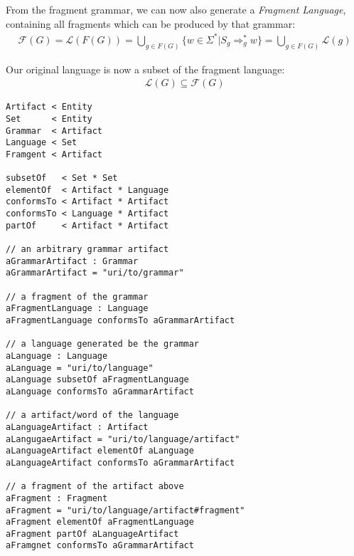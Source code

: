 \documentclass[runningheads,a4paper]{llncs}
\begin{document}
From the fragment grammar, we can now also generate a \textit{Fragment Language}, containing all fragments which can be produced by that grammar:
\begin{align*}
\mathcal{F}(G) 
= \mathcal{L}(F(G))
= \bigcup\limits_{g \in F(G)} \{ w \in \Sigma^* | S_g \Rightarrow_{g}^* w \}
= \bigcup\limits_{g \in F(G)} \mathcal{L}(g)
\end{align*}

Our original language is now a subset of the fragment language:
\begin{align*}
\mathcal{L}(G) \subseteq \mathcal{F}(G) 
\end{align*}

\newpage

\begin{lstlisting}
Artifact < Entity
Set      < Entity
Grammar  < Artifact
Language < Set
Framgent < Artifact

subsetOf   < Set * Set
elementOf  < Artifact * Language
conformsTo < Artifact * Artifact
conformsTo < Language * Artifact
partOf     < Artifact * Artifact

// an arbitrary grammar artifact
aGrammarArtifact : Grammar
aGrammarArtifact = "uri/to/grammar"

// a fragment of the grammar
aFragmentLanguage : Language
aFragmentLanguage conformsTo aGrammarArtifact

// a language generated be the grammar
aLanguage : Language
aLanguage = "uri/to/language"
aLanguage subsetOf aFragmentLanguage
aLanguage conformsTo aGrammarArtifact

// a artifact/word of the language
aLanguageArtifact : Artifact
aLangugaeArtifact = "uri/to/language/artifact"
aLanguageArtifact elementOf aLanguage
aLanguageArtifact conformsTo aGrammarArtifact

// a fragment of the artifact above
aFragment : Fragment
aFragment = "uri/to/language/artifact#fragment"
aFragment elementOf aFragmentLanguage
aFragment partOf aLanguageArtifact
aFramgnet conformsTo aGrammarArtifact
\end{lstlisting}
\end{document}
